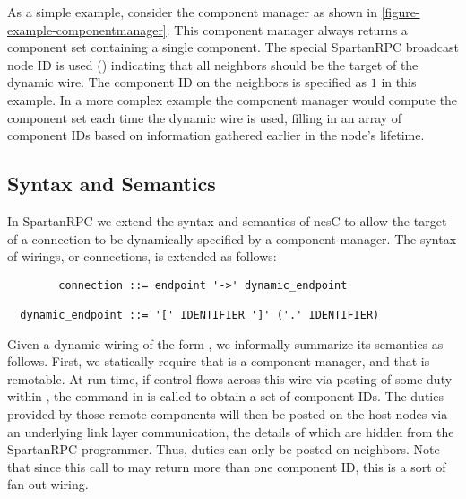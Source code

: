 As a simple example, consider the component manager
 as shown in
\autoref{figure-example-componentmanager}. This component manager always
returns a component set containing a single component. The special
SpartanRPC broadcast node ID is used () indicating that all
neighbors should be the target of the dynamic wire. The component ID on
the neighbors is specified as $1$ in this example. In a more complex
example the component manager would compute the component set each time
the dynamic wire is used, filling in an array of component IDs based on
information gathered earlier in the node's lifetime.


\subsection{Syntax and Semantics}
\label{section-wiringsyntax}

In SpartanRPC we extend the syntax and semantics of nesC to allow the
target of a connection to be dynamically specified by a component
manager. The syntax of wirings, or connections, is extended as follows:

\begin{lrbox}{\savebigbox}
\begin{minipage}{4.3in}
\vspace{0.6em}
\begin{Verbatim}
        connection ::= endpoint '->' dynamic_endpoint

  dynamic_endpoint ::= '[' IDENTIFIER ']' ('.' IDENTIFIER)
\end{Verbatim}
\vspace{0.3em}
\end{minipage}
\end{lrbox}
\centerline{\usebox{\savebigbox}}

Given a dynamic wiring of the form , we informally
summarize its semantics as follows. First, we statically require that
 is a component manager, and that  is remotable. At
run time, if control flows across this wire via posting of some duty
 within , the command  in 
is called to obtain a set of component IDs. The duties 
provided by those remote components will then be posted on the host
nodes via an underlying link layer communication, the details of which
are hidden from the SpartanRPC programmer. Thus, duties can only be
posted on neighbors. Note that since this call to  may
return more than one component ID, this is a sort of fan-out wiring.

